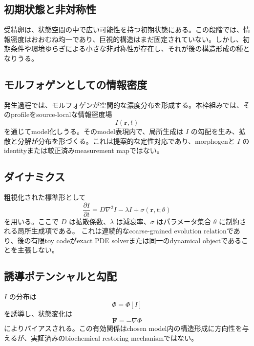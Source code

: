 \documentclass[11pt]{ltjsarticle}
\newcommand{\I}{I}
\newcommand{\PhiI}{\Phi}
\begin{document}
\subsection{初期状態と非対称性}

受精卵は、状態空間の中で広い可能性を持つ初期状態にある。この段階では、情報密度はおおむね均一であり、巨視的構造はまだ固定されていない。しかし、初期条件や環境ゆらぎによる小さな非対称性が存在し、それが後の構造形成の種となりうる。

\subsection{モルフォゲンとしての情報密度}

発生過程では、モルフォゲンが空間的な濃度分布を形成する。本枠組みでは、そのprofileをsource-localな情報密度場
\begin{equation}
  \I(\mathbf{r},t)
\end{equation}
を通じてmodel化しうる。そのmodel表現内で、局所生成は \(\I\) の勾配を生み、拡散と分解が分布を形づくる。これは提案的な定性対応であり、morphogenと \(\I\) のidentityまたは較正済みmeasurement mapではない。

\subsection{ダイナミクス}

粗視化された標準形として
\begin{equation}
  \frac{\partial \I}{\partial t}
  =D\nabla^2\I-\lambda\I+\sigma(\mathbf{r},t;\theta)
\end{equation}
を用いる。ここで \(D\) は拡散係数、\(\lambda\) は減衰率、\(\sigma\) はパラメータ集合 \(\theta\) に制約される局所生成項である。
これは連続的なcoarse-grained evolution relationであり、後の有限toy codeがexact PDE solverまたは同一のdynamical objectであることを主張しない。

\subsection{誘導ポテンシャルと勾配}

\(\I\) の分布は
\begin{equation}
  \PhiI=\PhiI[\I]
\end{equation}
を誘導し、状態変化は
\begin{equation}
  \mathbf{F}=-\nabla\PhiI
\end{equation}
によりバイアスされる。この有効関係はchosen model内の構造形成に方向性を与えるが、実証済みのbiochemical restoring mechanismではない。
\end{document}
